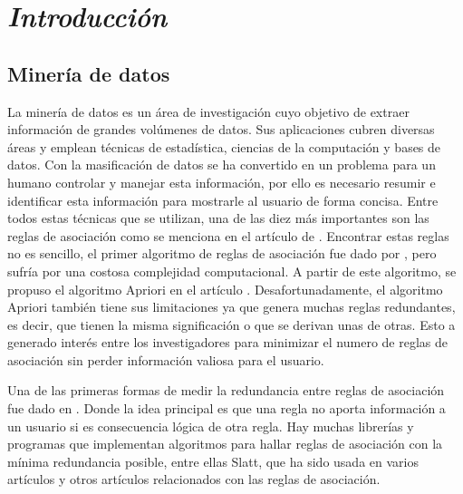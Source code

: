 \documentclass{cosas/tfg_domingo}
\begin{document}

\portada
\frontmatter
\gracias{}
\resumen{}{}
\tableofcontents

\mainmatter
\chapter{\emph{Introducción}}

\section{Minería de datos}
La minería de datos es un área de investigación cuyo objetivo de extraer información de grandes volúmenes de datos.
Sus aplicaciones cubren diversas áreas y emplean técnicas de estadística, ciencias de la computación y bases de datos. Con la masificación de datos se ha convertido en un problema para un humano controlar y manejar esta información, por ello es necesario resumir e identificar esta información para mostrarle al usuario de forma concisa.
Entre todos estas técnicas que se utilizan, una de las diez más importantes son las reglas de asociación como se menciona en el artículo de \citet{wu2008top}.
Encontrar estas reglas no es sencillo, el primer algoritmo de reglas de asociación fue dado por  \citet{agrawal1993mining}, pero sufría por una costosa complejidad computacional.
A partir de este algoritmo, se propuso el algoritmo Apriori en el artículo  \citet{agrawal1994fast}.
Desafortunadamente, el algoritmo Apriori también tiene sus limitaciones ya que genera muchas reglas redundantes, es decir, que tienen la misma significación o que se derivan unas de otras. Esto a generado interés entre los investigadores para minimizar el numero de reglas de asociación sin perder información valiosa para el usuario. \par

Una de las primeras formas de medir la redundancia entre reglas de asociación fue dado en \citep{kryszkiewicz2001closed}. Donde la idea principal es que una regla no aporta información a un usuario si es consecuencia lógica de otra regla.
Hay muchas librerías y programas que implementan algoritmos para hallar reglas de asociación con la mínima redundancia posible, entre ellas Slatt, que ha sido usada en varios artículos \citep{balcazar2010closure, tirnuaucua2020closed} y otros artículos relacionados con las reglas de asociación.
\end{document}
